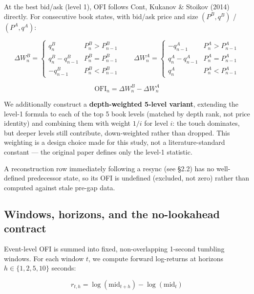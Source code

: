 \documentclass[11pt]{article}
\begin{document}
At the best bid/ask (level 1), OFI follows Cont, Kukanov \& Stoikov (2014) directly. For consecutive book states, with bid/ask price and size $(P^B, q^B)$ / $(P^A, q^A)$:

\begin{equation}
\Delta W^B_n =
\begin{cases}
q^B_n & P^B_n > P^B_{n-1} \\
q^B_n - q^B_{n-1} & P^B_n = P^B_{n-1} \\
-q^B_{n-1} & P^B_n < P^B_{n-1}
\end{cases}
\qquad
\Delta W^A_n =
\begin{cases}
-q^A_{n-1} & P^A_n > P^A_{n-1} \\
q^A_n - q^A_{n-1} & P^A_n = P^A_{n-1} \\
q^A_n & P^A_n < P^A_{n-1}
\end{cases}
\end{equation}

\begin{equation}
\text{OFI}_n = \Delta W^B_n - \Delta W^A_n
\end{equation}

We additionally construct a \textbf{depth-weighted 5-level variant}, extending the level-1 formula to each of the top 5 book levels (matched by depth rank, not price identity) and combining them with weight $1/i$ for level $i$: the touch dominates, but deeper levels still contribute, down-weighted rather than dropped. This weighting is a design choice made for this study, not a literature-standard constant --- the original paper defines only the level-1 statistic.

A reconstruction row immediately following a resync (see \S2.2) has no well-defined predecessor state, so its OFI is undefined (excluded, not zero) rather than computed against stale pre-gap data.

\subsection{Windows, horizons, and the no-lookahead contract}

Event-level OFI is summed into fixed, non-overlapping 1-second tumbling windows. For each window $t$, we compute forward log-returns at horizons $h \in \{1, 2, 5, 10\}$ seconds:

\begin{equation}
r_{t,h} = \log(\text{mid}_{t+h}) - \log(\text{mid}_t)
\end{equation}
\end{document}
